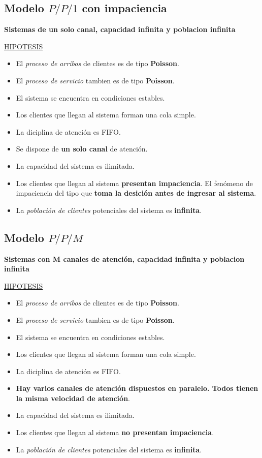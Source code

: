 \documentclass{article}
\begin{document}
\subsection{Modelo \(P/P/1\) con impaciencia}
\textbf{Sistemas de un solo canal, capacidad infinita y poblacion infinita}

\noindent
\underline{HIPOTESIS}
\begin{itemize}
    \item El \textit{proceso de arribos} de clientes es de tipo \textbf{Poisson}.
    \item El \textit{proceso de servicio} tambien es de tipo \textbf{Poisson}.
    \item El sistema se encuentra en condiciones estables.
    \item Los clientes que llegan al sistema forman una cola simple.
    \item La diciplina de atención es FIFO.
    \item Se dispone de \textbf{un solo canal} de atención.
    \item La capacidad del sistema es ilimitada.
    \item Los clientes que llegan al sistema \textbf{presentan impaciencia}. El fenómeno de impaciencia del tipo que \textbf{toma la desición antes de ingresar al sistema}.
    \item La \textit{población de clientes} potenciales del sistema es \textbf{infinita}.
\end{itemize}

\subsection{Modelo \(P/P/M\)}

\textbf{Sistemas con M canales de atención, capacidad infinita y poblacion infinita}

\noindent
\underline{HIPOTESIS}
\begin{itemize}
    \item El \textit{proceso de arribos} de clientes es de tipo \textbf{Poisson}.
    \item El \textit{proceso de servicio} tambien es de tipo \textbf{Poisson}.
    \item El sistema se encuentra en condiciones estables.
    \item Los clientes que llegan al sistema forman una cola simple.
    \item La diciplina de atención es FIFO.
    \item \textbf{Hay varios canales de atención dispuestos en paralelo. Todos tienen la misma velocidad de atención}.
    \item La capacidad del sistema es ilimitada.
    \item Los clientes que llegan al sistema \textbf{no presentan impaciencia}.
    \item La \textit{población de clientes} potenciales del sistema es \textbf{infinita}.
\end{itemize}
\end{document}
